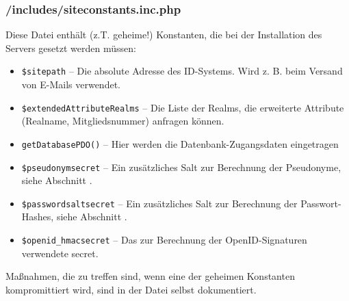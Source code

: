 \subsubsection{/includes/siteconstants.inc.php}
Diese Datei enthält (z.T. geheime!) Konstanten, die bei der Installation des Servers gesetzt werden müssen:
\begin{itemize}
	\item \texttt{\$sitepath} -- Die absolute Adresse des ID-Systems. Wird z. B. beim Versand von E-Mails verwendet.
	\item \texttt{\$extendedAttributeRealms} -- Die Liste der Realms, die erweiterte Attribute (Realname, Mitgliedsnummer) anfragen können.
	\item \texttt{getDatabasePDO()} -- Hier werden die Datenbank-Zugangsdaten eingetragen
	\item \texttt{\$pseudonymsecret} -- Ein zusätzliches Salt zur Berechnung der Pseudonyme, siehe Abschnitt .
	\item \texttt{\$passwordsaltsecret} -- Ein zusätzliches Salt zur Berechnung der Passwort-Hashes, siehe Abschnitt .
	\item \texttt{\$openid\_hmacsecret} -- Das zur Berechnung der OpenID-Signaturen verwendete secret. 
\end{itemize}
Maßnahmen, die zu treffen sind, wenn eine der geheimen Konstanten kompromittiert wird, sind in der Datei selbst dokumentiert.


